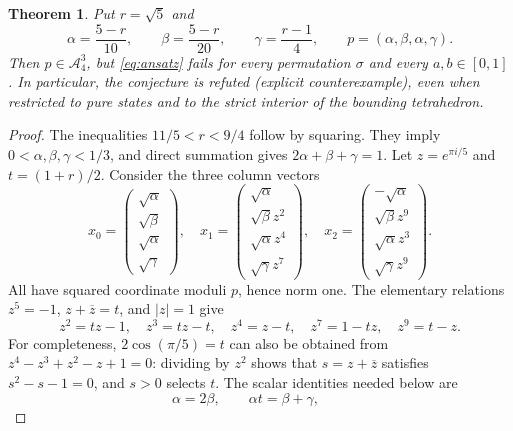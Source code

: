 \documentclass[11pt]{article}
\newtheorem{theorem}{Theorem}
\newcommand{\A}{\mathcal A}
\begin{document}
\begin{theorem}\label{thm:main}
Put $r=\sqrt5$ and
\begin{equation}\label{eq:point}
 \alpha=\frac{5-r}{10},\qquad
 \beta=\frac{5-r}{20},\qquad
 \gamma=\frac{r-1}{4},\qquad
 p=(\alpha,\beta,\alpha,\gamma).
\end{equation}
Then $p\in\A_4^3$, but \eqref{eq:ansatz} fails for every permutation
$\sigma$ and every $a,b\in[0,1]$. In particular, the conjecture is
refuted (explicit counterexample), even when restricted to pure states and
to the strict interior of the bounding tetrahedron.
\end{theorem}

\begin{proof}
The inequalities $11/5<r<9/4$ follow by squaring. They imply
$0<\alpha,\beta,\gamma<1/3$, and direct summation gives
$2\alpha+\beta+\gamma=1$.
Let $z=e^{\pi i/5}$ and $t=(1+r)/2$. Consider the three column vectors
\begin{equation}\label{eq:states}
 x_0=\begin{pmatrix}\sqrt\alpha\\\sqrt\beta\\\sqrt\alpha\\\sqrt\gamma\end{pmatrix},\quad
 x_1=\begin{pmatrix}\sqrt\alpha\\\sqrt\beta z^2\\\sqrt\alpha z^4\\\sqrt\gamma z^7\end{pmatrix},\quad
 x_2=\begin{pmatrix}-\sqrt\alpha\\\sqrt\beta z^9\\\sqrt\alpha z^3\\\sqrt\gamma z^9\end{pmatrix}.
\end{equation}
All have squared coordinate moduli $p$, hence norm one. The elementary
relations $z^5=-1$, $z+\overline z=t$, and $|z|=1$ give
\begin{equation}\label{eq:powers}
 z^2=tz-1,\quad z^3=tz-t,\quad z^4=z-t,\quad
 z^7=1-tz,\quad z^9=t-z.
\end{equation}
For completeness, $2\cos(\pi/5)=t$ can also be obtained from
$z^4-z^3+z^2-z+1=0$: dividing by $z^2$ shows that
$s=z+\overline z$ satisfies $s^2-s-1=0$, and $s>0$ selects $t$.
The scalar identities needed below are
\begin{equation}\label{eq:weights}
 \alpha=2\beta,\qquad \alpha t=\beta+\gamma,\qquad

\end{equation}
\end{proof}
\end{document}
